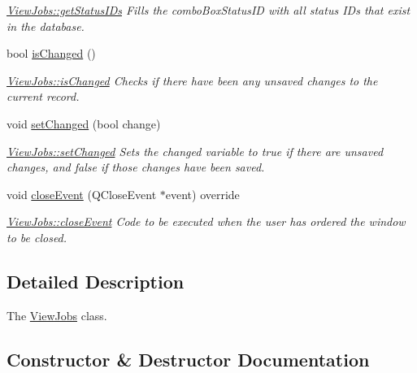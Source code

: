 \begin{DoxyCompactItemize}
\begin{DoxyCompactList}\small\item\em \hyperlink{class_view_jobs_adabe196e81c74d17c436de1a6ea12099}{View\+Jobs\+::get\+Status\+I\+Ds} Fills the combo\+Box\+Status\+ID with all status I\+Ds that exist in the database. \end{DoxyCompactList}\item 
bool \hyperlink{class_view_jobs_a5f75b45d28ce7f4a8050ce9ce0f44350}{is\+Changed} ()
\begin{DoxyCompactList}\small\item\em \hyperlink{class_view_jobs_a5f75b45d28ce7f4a8050ce9ce0f44350}{View\+Jobs\+::is\+Changed} Checks if there have been any unsaved changes to the current record. \end{DoxyCompactList}\item 
void \hyperlink{class_view_jobs_a3cba868c6deadaf4b35c18982f7ec35e}{set\+Changed} (bool change)
\begin{DoxyCompactList}\small\item\em \hyperlink{class_view_jobs_a3cba868c6deadaf4b35c18982f7ec35e}{View\+Jobs\+::set\+Changed} Sets the changed variable to true if there are unsaved changes, and false if those changes have been saved. \end{DoxyCompactList}\item 
void \hyperlink{class_view_jobs_a832503ca9eb4e4bf79c2fb48a59141aa}{close\+Event} (Q\+Close\+Event $\ast$event) override
\begin{DoxyCompactList}\small\item\em \hyperlink{class_view_jobs_a832503ca9eb4e4bf79c2fb48a59141aa}{View\+Jobs\+::close\+Event} Code to be executed when the user has ordered the window to be closed. \end{DoxyCompactList}\end{DoxyCompactItemize}


\subsection{Detailed Description}
The \hyperlink{class_view_jobs}{View\+Jobs} class. 

\subsection{Constructor \& Destructor Documentation}
\mbox{\label{class_view_jobs_ac78f48cc812a0348a233f33dc78a71cc}} 
